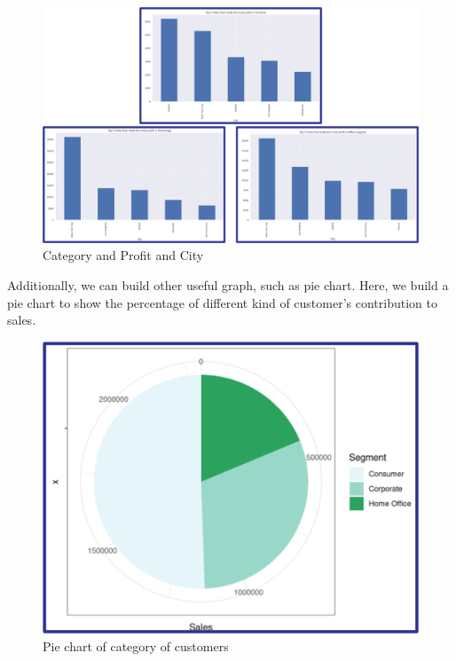 \begin{figure}[H]
    \centering
    \includegraphics[width=\columnwidth]{images/cata3.png}
    \caption[Short text]{Category and Profit and City}
    \label{fig:Category&Profit&City}
\end{figure}

Additionally, we can build other useful graph, such as pie chart. Here, we build a pie chart to show the percentage of different kind of customer's contribution to sales.

\begin{figure}[H]
    \centering
    \includegraphics[width=\columnwidth]{images/pie.png}
    \caption[Short text]{Pie chart of category of customers}
    \label{fig:Pie Chart}
\end{figure}